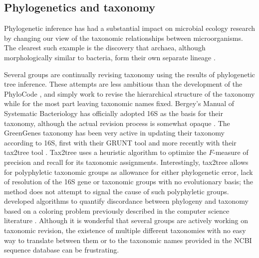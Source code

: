 \documentclass{amsart}
\begin{document}
\subsection{Phylogenetics and taxonomy}

Phylogenetic inference has had a substantial impact on microbial ecology research by changing our view of the taxonomic relationships between microorganisms.
The clearest such example is the discovery that archaea, although morphologically similar to bacteria, form their own separate lineage \citep{woese1977phylogenetic}.

Several groups are continually revising taxonomy using the results of phylogenetic tree inference.
These attempts are less ambitious than the development of the PhyloCode \citep{forey2001phylocode}, and simply work to revise the hierarchical structure of the taxonomy while for the most part leaving taxonomic names fixed.
Bergey's Manual of Systematic Bacteriology has officially adopted 16S as the basis for their taxonomy, although the actual revision process is somewhat opaque \citep{kreig1984bergey}.
The GreenGenes taxonomy \citep{desantis2006greengenes} has been very active in updating their taxonomy according to 16S, first with their GRUNT tool \citep{dalevi2007automated} and more recently with their tax2tree tool \citep{mcdonald2011improved}.
Tax2tree uses a heuristic algorithm to optimize the $F$-measure of precision and recall for its taxonomic assignments.
Interestingly, tax2tree allows for polyphyletic taxonomic groups as allowance for either phylogenetic error, lack of resolution of the 16S gene or taxonomic groups with no evolutionary basis; the method does not attempt to signal the cause of such polyphyletic groups.
\citet{matsen2012reconciling} developed algorithms to quantify discordance between phylogeny and taxonomy based on a coloring problem previously described in the computer science literature \citep{moran2008convex}.
Although it is wonderful that several groups are actively working on taxonomic revision, the existence of multiple different taxonomies with no easy way to translate between them or to the taxonomic names provided in the NCBI sequence database can be frustrating.
\end{document}
